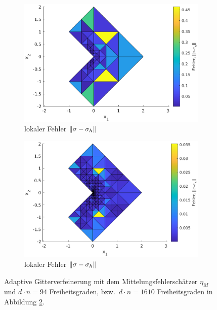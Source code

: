 \documentclass{scrartcl}
\DeclarePairedDelimiter{\norm}{\lVert}{\rVert}
\begin{document}
\begin{figure}[h]
\begin{subfigure}[b]{0.45\textwidth}
\centering
\includegraphics[width=\textwidth]{Plots/LShapeBenchmarkLocalNormSigDiff94}
\caption{lokaler Fehler $\norm{\sigma-\sigma_h}$}
\end{subfigure}
\hfill
\begin{subfigure}[b]{0.45\textwidth}
\centering
\includegraphics[width=\textwidth]{Plots/LShapeBenchmarkLocalNormSigDiff1610}
\caption{lokaler Fehler $\norm{\sigma-\sigma_h}$}
\label{pl:LShapeLocalNormSigDiff1506}
\end{subfigure}
\caption{Adaptive Gitterverfeinerung mit dem Mittelungsfehlerschätzer $\eta_M$ und $d\cdot n=94$ Freiheitsgraden, bzw.\ $d\cdot n=1610$ Freiheitsgraden in Abbildung \ref{pl:LShapeLocalNormSigDiff1506}.}
\end{figure}
\end{document}
